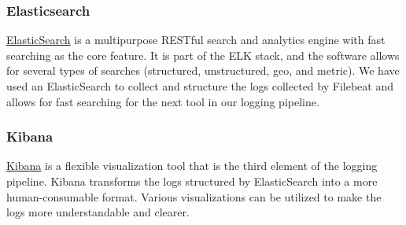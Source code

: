 \documentclass[11pt]{article}
\begin{document}
\subsubsection{Elasticsearch}
\href{https://www.elastic.co/elasticsearch/}{ElasticSearch} is a multipurpose RESTful search and analytics engine with fast searching as the core feature. It is part of the ELK stack, and the software allows for several types of searches (structured, unstructured, geo, and metric). We have used an ElasticSearch to collect and structure the logs collected by Filebeat and allows for fast searching for the next tool in our logging pipeline.

\subsubsection{Kibana}
\href{https://www.elastic.co/kibana}{Kibana} is a flexible visualization tool that is the third element of the logging pipeline. Kibana transforms the logs structured by ElasticSearch into a more human-consumable format. Various visualizations can be utilized to make the logs more understandable and clearer.
\end{document}
